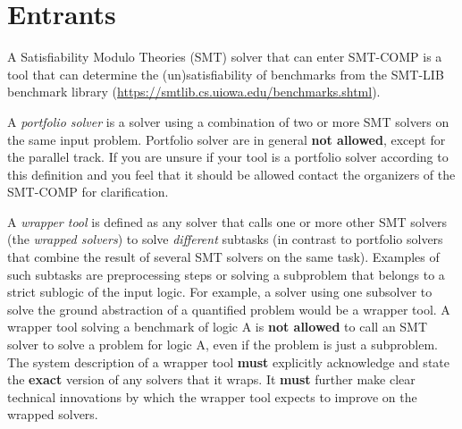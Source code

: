 \documentclass[12pt]{article}
\begin{document}

\section{Entrants}
\label{sec:entrants}


%
A Satisfiability Modulo Theories (SMT) solver that can enter SMT-COMP is a tool that can determine the
(un)satisfia\-bility of benchmarks from the SMT-LIB benchmark library
(\url{https://smtlib.cs.uiowa.edu/benchmarks.shtml}).

%
A \emph{portfolio solver} is a solver using a combination of two or
more SMT solvers on the same input problem. Portfolio solver are in
general \textbf{not allowed}, except for the parallel track.
If you are unsure if your tool is a portfolio
solver according to this definition and you feel that it should be allowed
contact the organizers of the SMT-COMP for clarification.

%
A \emph{wrapper tool} is defined as any solver that calls one or more other SMT
solvers (the \emph{wrapped solvers}) to solve \emph{different} subtasks
(in contrast to portfolio solvers that combine the result of several SMT
solvers on the same task).
Examples of such subtasks are preprocessing steps or solving a subproblem that
belongs to a strict sublogic of the input logic.
For example, a solver using one subsolver to solve the ground abstraction of a
quantified problem would be a wrapper tool.
A wrapper tool solving a benchmark of logic A
is \textbf{not allowed} to call an SMT solver to solve a problem for logic A,
even if the problem is just a subproblem.
The system description of a wrapper tool \textbf{must}
explicitly acknowledge and state the \textbf{exact} version of any solvers that
it wraps.  It \textbf{must} further make clear technical innovations by which
the wrapper tool expects to improve on the wrapped solvers.
\end{document}
